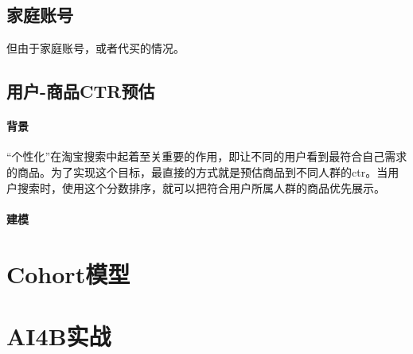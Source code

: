 	\subsection{家庭账号}
	但由于家庭账号，或者代买的情况。
	\subsection{用户-商品CTR预估}
	\paragraph{背景}
	“个性化”在淘宝搜索中起着至关重要的作用，即让不同的用户看到最符合自己需求的商品。为了实现这个目标，最直接的方式就是预估商品到不同人群的ctr。当用户搜索时，使用这个分数排序，就可以把符合用户所属人群的商品优先展示。
	\paragraph{建模}
	
\section{Cohort模型} 

\section{AI4B实战} 

\begin{thebibliography}{99}
\end{thebibliography}

 
